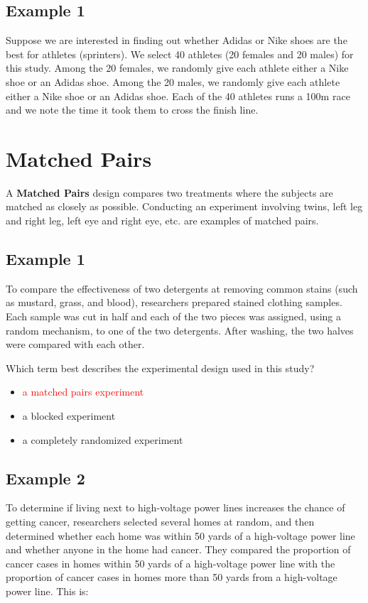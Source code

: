 \subsection*{Example 1}

Suppose we are interested in finding out whether Adidas or Nike shoes are the best for athletes (sprinters). We select 40 athletes (20 females and 20 males) for this study. Among the 20 females, we randomly give each athlete either a Nike shoe or an Adidas shoe. Among the 20 males, we randomly give each athlete either a Nike shoe or an Adidas shoe. Each of the 40 athletes runs a 100m race and we note the time it took them to cross the finish line.

\section{Matched Pairs}

A \textbf{Matched Pairs} design compares two treatments where the subjects are matched as closely as possible. Conducting an experiment involving twins, left leg and right leg, left eye and right eye, etc. are examples of matched pairs.

\subsection*{Example 1}

To compare the effectiveness of two detergents at removing common stains (such as mustard, grass, and blood), researchers prepared stained clothing samples. Each sample was cut in half and each of the two pieces was assigned, using a random mechanism, to one of the two detergents. After washing, the two halves were compared with each other.

Which term best describes the experimental design used in this study?

\begin{itemize}
    \item \textcolor{red}{a matched pairs experiment}
    \item a blocked experiment
    \item a completely randomized experiment
\end{itemize}

\subsection*{Example 2}

To determine if living next to high-voltage power lines increases the chance of getting cancer, researchers selected several homes at random, and then determined whether each home was within 50 yards of a high-voltage power line and whether anyone in the home had cancer. They compared the proportion of cancer cases in homes within 50 yards of a high-voltage power line with the proportion of cancer cases in homes more than 50 yards from a high-voltage power line. This is:

